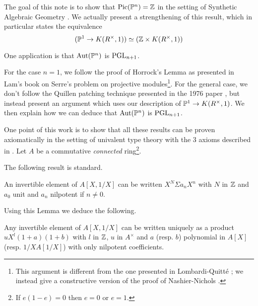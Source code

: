 The goal of this note is to show that $\mathrm{Pic}(\mathbb{P}^n) = \mathbb{Z}$ in the setting of Synthetic Algebraic
Geometry \cite{draft}. We actually present a strengthening of this result,
which in particular states the equivalence
$$(\mathbb{P}^1\to{K(R^{\times},1)})\simeq (\mathbb{Z}\times K(R^{\times},1))$$

One application is that $\mathrm{Aut}(\mathbb{P}^n)$ is $\operatorname{PGL}_{n+1}$.

For the case $n=1$,
we follow the proof of Horrock's Lemma as presented in Lam's book on Serre's problem \cite{Lam}
on projective modules\footnote{This argument is different from the one presented in Lombardi-Quitt\'e \cite{lombardi-quitte}; we instead give a constructive version of the proof of Nashier-Nichols \cite{Nashier}.}.
For the general case, we don't follow the Quillen patching technique
presented in the 1976 paper \cite{Quillen}, but instead present an argument which uses
our description of ${\mathbb{P}^1}\to{K(R^{\times},1)}$.
We then explain how we can deduce that $\mathrm{Aut}(\mathbb{P}^n)$ is $\operatorname{PGL}_{n+1}$.

 One point of this work is to show that all these results can be proven axiomatically in the
 setting of univalent type theory with the 3 axioms described in \cite{draft}.
 Let $A$ be a commutative {\em connected} ring\footnote{If $e(1-e) = 0$ then $e=0$ or $e=1$.}.

The following result is standard.

 \begin{lemma}\label{stand}
   An invertible element of $A[X,1/X]$ can be written $X^N\Sigma a_nX^n$ with $N$ in $\mathbb{Z}$
   and $a_0$ unit and $a_n$ nilpotent if $n\neq 0$.
 \end{lemma}
 
 Using this Lemma we deduce the following.

\begin{lemma}\label{nilpotent}
  Any invertible element of $A[X,1/X]$ can be written uniquely as a product
  $uX^l(1+a)(1+b)$ with $l$ in $\mathbb{Z}$, $u$ in $A^{\times}$ and $a$ (resp. $b$)
  polynomial in $A[X]$ (resp. $1/XA[1/X]$) with only nilpotent coefficients.
\end{lemma}

